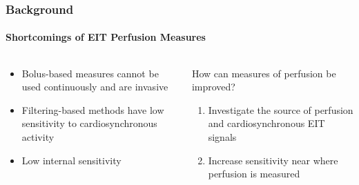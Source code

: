 \documentclass[10pt,    %
    english,            %
    xcolor=table,       %
    envcountsect,        %
    aspectratio=1610
]{beamer}
\begin{document}
\begin{frame}
	\frametitle{Background}
	\framesubtitle{Shortcomings of EIT Perfusion Measures}
	\begin{columns}[c]
		\begin{column}{0.5\textwidth}
			\begin{itemize}
				\item Bolus-based measures cannot be used continuously and are invasive
				\item Filtering-based methods have low sensitivity to cardiosynchronous activity
				\item Low internal sensitivity 
			\end{itemize}
		\end{column}
		\begin{column}{0.5\textwidth}
			How can measures of \alert{perfusion} be improved? 
			\begin{enumerate}
				\item Investigate the source of perfusion and cardiosynchronous EIT signals
				\item Increase sensitivity near where perfusion is measured
			\end{enumerate}
		\end{column}
		\end{columns}	
\end{frame}
\end{document}
